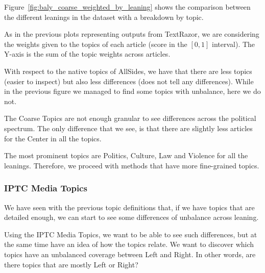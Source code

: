 Figure~\ref{fig:baly_coarse_weighted_by_leaning} shows the comparison between the different leanings in the dataset with a breakdown by topic.

As in the previous plots representing outputs from TextRazor, we are considering the weights given to the topics of each article (score in the $[0,1]$ interval). The Y-axis is the sum of the topic weights across articles.

With respect to the native topics of AllSides, we have that there are less topics (easier to inspect) but also less differences (does not tell any differences).
While in the previous figure we managed to find some topics with unbalance, here we do not.

The Coarse Topics are not enough granular to see differences across the political spectrum. The only difference that we see, is that there are slightly less articles for the Center in all the topics.

The most prominent topics are Politics, Culture, Law and Violence for all the leanings.
Therefore, we proceed with methods that have more fine-grained topics.






\subsubsection{\statusgreen IPTC Media Topics}

We have seen with the previous topic definitions that, if we have topics that are detailed enough, we can start to see some differences of unbalance across leaning.

Using the IPTC Media Topics, we want to be able to see such differences, but at the same time have an idea of how the topics relate.
%
We want to discover which topics have an unbalanced coverage between Left and Right. In other words, are there topics that are mostly Left or Right?


